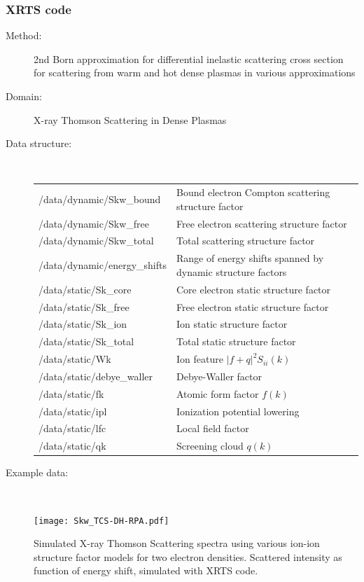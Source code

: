 \documentclass[12pt]{scrartcl}
\begin{document}
\subsubsection{XRTS code\label{sec:interface_scat_xrts}}
\begin{description}
  \item[Method:] 2nd Born approximation for differential inelastic scattering cross section for scattering from warm and hot dense plasmas in various
    approximations \cite{Gregori2006a, Fortmann2009d, Fortmann2010a}
  \item[Domain:] X-ray Thomson Scattering in Dense Plasmas
  \item[Data structure:]\ \\
{\scriptsize%
  \begin{tabular}[ ]{l|l}
    \hline
    \hline
    /data/dynamic/Skw\_bound & Bound electron Compton scattering structure factor \\
    /data/dynamic/Skw\_free &  Free electron scattering structure factor\\
    /data/dynamic/Skw\_total & Total scattering structure factor \\
    /data/dynamic/energy\_shifts & Range of energy shifts spanned by dynamic
    structure factors \\
    /data/static/Sk\_core     & Core electron static structure factor \\
    /data/static/Sk\_free      & Free electron static structure factor \\
    /data/static/Sk\_ion           & Ion static structure factor \\
    /data/static/Sk\_total         & Total static structure factor \\
    /data/static/Wk               & Ion feature $|f+q|^2 S_{ii}(k)$ \\
    /data/static/debye\_waller     & Debye-Waller factor \\
    /data/static/fk               & Atomic form factor $f(k)$ \\
    /data/static/ipl              & Ionization potential lowering \\
    /data/static/lfc              & Local field factor \\
    /data/static/qk               & Screening cloud $q(k)$ \\
    \hline
    \hline
  \end{tabular}
}
\item[Example data:]\ \\
      \begin{center}
        \texttt{[image: Skw\_TCS-DH-RPA.pdf]}
      \end{center}
      \scriptsize{Simulated X-ray Thomson Scattering spectra using various ion-ion
      structure factor models for two electron densities. Scattered intensity as
    function of energy shift, simulated with XRTS code.}
\end{description}
%
\end{document}
